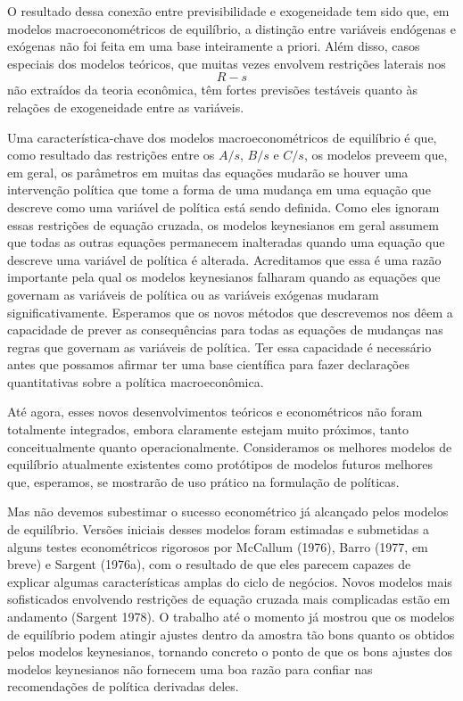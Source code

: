 \documentclass[12pt]{article}
\begin{document}
O resultado dessa conexão entre previsibilidade e exogeneidade tem sido que, em modelos macroeconométricos de equilíbrio, a distinção entre variáveis endógenas e exógenas não foi feita em uma base inteiramente a priori. Além disso, casos especiais dos modelos teóricos, que muitas vezes envolvem restrições laterais nos $$R-s$$ não extraídos da teoria econômica, têm fortes previsões testáveis quanto às relações de exogeneidade entre as variáveis.

Uma característica-chave dos modelos macroeconométricos de equilíbrio é que, como resultado das restrições entre os $A/s$, $B/s$ e $C/s$, os modelos preveem que, em geral, os parâmetros em muitas das equações mudarão se houver uma intervenção política que tome a forma de uma mudança em uma equação que descreve como uma variável de política está sendo definida. Como eles ignoram essas restrições de equação cruzada, os modelos keynesianos em geral assumem que todas as outras equações permanecem inalteradas quando uma equação que descreve uma variável de política é alterada. Acreditamos que essa é uma razão importante pela qual os modelos keynesianos falharam quando as equações que governam as variáveis de política ou as variáveis exógenas mudaram significativamente. Esperamos que os novos métodos que descrevemos nos dêem a capacidade de prever as consequências para todas as equações de mudanças nas regras que governam as variáveis de política. Ter essa capacidade é necessário antes que possamos afirmar ter uma base científica para fazer declarações quantitativas sobre a política macroeconômica.

Até agora, esses novos desenvolvimentos teóricos e econométricos não foram totalmente integrados, embora claramente estejam muito próximos, tanto conceitualmente quanto operacionalmente. Consideramos os melhores modelos de equilíbrio atualmente existentes como protótipos de modelos futuros melhores que, esperamos, se mostrarão de uso prático na formulação de políticas.

Mas não devemos subestimar o sucesso econométrico já alcançado pelos modelos de equilíbrio. Versões iniciais desses modelos foram estimadas e submetidas a alguns testes econométricos rigorosos por McCallum (1976), Barro (1977, em breve) e Sargent (1976a), com o resultado de que eles parecem capazes de explicar algumas características amplas do ciclo de negócios. Novos modelos mais sofisticados envolvendo restrições de equação cruzada mais complicadas estão em andamento (Sargent 1978). O trabalho até o momento já mostrou que os modelos de equilíbrio podem atingir ajustes dentro da amostra tão bons quanto os obtidos pelos modelos keynesianos, tornando concreto o ponto de que os bons ajustes dos modelos keynesianos não fornecem uma boa razão para confiar nas recomendações de política derivadas deles.
\end{document}
